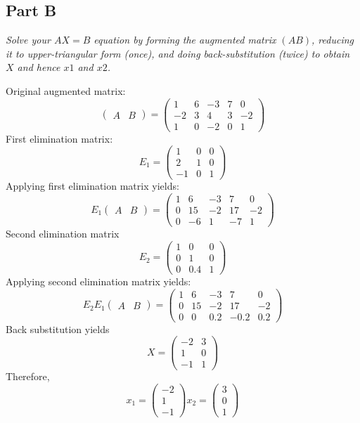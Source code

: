 \documentclass{article}
\begin{document}
\subsection*{Part B}

\textit{Solve your $ AX = B $ equation by forming the augmented matrix $ (AB) $,
reducing it to upper-triangular form (once), and doing back-substitution (twice)
to obtain $ X $ and hence  $ x1 $ and $ x2 $.}

\bigbreak

Original augmented matrix:
\[
    \begin{pmatrix}
        A & B
    \end{pmatrix}
    =
    \begin{pmatrix}
        1 & 6 & -3 & 7 & 0 \\
        -2 & 3 & 4 & 3 & -2 \\
        1 & 0 & -2 & 0 & 1
    \end{pmatrix}
\]
First elimination matrix:
\[
    E_1 = \begin{pmatrix}
        1 & 0 & 0 \\
        2 & 1 & 0 \\
        -1 & 0 & 1
    \end{pmatrix}
\]
Applying first elimination matrix yields:
\[
    E_1 \begin{pmatrix}
        A & B
    \end{pmatrix}
    =
    \begin{pmatrix}
        1 & 6 & -3 & 7 & 0 \\
        0 & 15 & -2 & 17 & -2 \\
        0 & -6 & 1 & -7 & 1
    \end{pmatrix}
\]
Second elimination matrix
\[
    E_2 = \begin{pmatrix}
        1 & 0 & 0 \\
        0 & 1 & 0 \\
        0 & 0.4 & 1
    \end{pmatrix}
\]
Applying second elimination matrix yields:
\[
    E_2 E_1 \begin{pmatrix}
        A & B
    \end{pmatrix}
    =
    \begin{pmatrix}
        1 & 6 & -3 & 7 & 0 \\
        0 & 15 & -2 & 17 & -2 \\
        0 & 0 & 0.2 & -0.2 & 0.2
    \end{pmatrix}
\]
Back substitution yields
\[
    X = \begin{pmatrix}
        -2 & 3 \\
        1 & 0 \\
        -1 & 1
    \end{pmatrix}
\]
Therefore,
\[
    x_1 = \begin{pmatrix}
        -2 \\
        1 \\
        -1
    \end{pmatrix}
    x_2 = \begin{pmatrix}
        3 \\
        0 \\
        1
    \end{pmatrix}
\]
\end{document}
